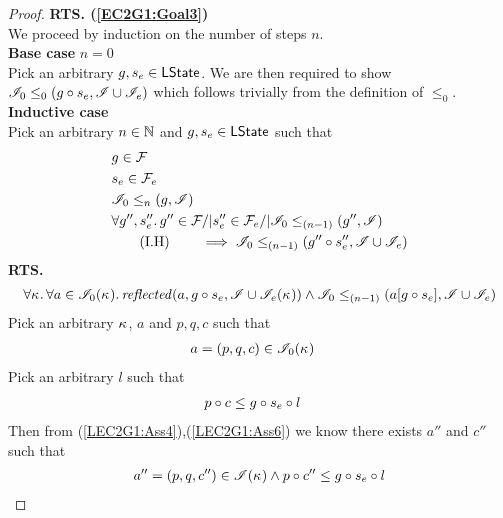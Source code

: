 \begin{lemma}
\begin{proof}
\noindent\textbf{RTS. (\ref{EC2G1:Goal3})} \\
We proceed by induction on the number of steps $n$.\\

\noindent\textbf{Base case }$n=0$\\
Pick an arbitrary $g, s_e \in \textsf{LState}$. We are then required to show	$\mathscr{I}_0 \leq_{0}\left(g \circ s_e, \mathscr{I} \cup \mathscr{I}_e\right)$ which follows trivially from the definition of $\leq_0$.\\


\noindent\textbf{Inductive case }\\
Pick an arbitrary $n \in \mathbb{N}$ and $g, s_e \in \textsf{LState}$ such that
%
\begin{align}
	& g \in \mathcal{F}_{} \label{LEC2G1:Ass1}\\
	& s_e \in \mathcal{F}_{e} \label{LEC2G1:Ass2}\\
	& \mathscr{I}_0 \leq_{n}\left(g, \mathscr{I}\right) \label{LEC2G1:Ass4}\\
	& \forall g'', s_e''.\,  g'' \in \mathcal{F}_{} /| s''_e \in \mathcal{F}_{e} /| \mathscr{I}_0 \leq_{(n-1)}\left(g'', \mathscr{I}\right) \nonumber \\
	& \tag{I.H} \qquad \implies \mathscr{I}_0 \leq_{(n-1)}\left(g''\circ s_e'', \mathscr{I} \cup \mathscr{I}_{e}\right) \label{LEC2G1:IH}
\end{align}
%
\textbf{RTS.}
%
\begin{align*}  
	& \quad
  \begin{array}{@{} l @{}}
  	\for{\ca{}}\for{a \in \lmod_0(\ca{})}
		\m{reflected}(a,g \composeL s_e, \lmod \cup \lmod_e(\ca{})) \land
		\isContainedAM{\lmod_0}{(n-1)}{a[g \composeL s_e]}{\lmod \cup \lmod_e}
 	\end{array} 
\end{align*}
%
Pick an arbitrary $\kappa_{}$, $a$ and $p, q, c$ such that
%
\begin{align}
	& a = (p, q, c) \in \mathscr{I}_0(\kappa_{}) \label{LEC2G1:Ass5}
\end{align}
Pick an arbitrary $l$ such that
%
\begin{align}
	& p \circ c \leq g \circ s_e \circ l \label{LEC2G1:Ass6}
\end{align}
Then from (\ref{LEC2G1:Ass4}),(\ref{LEC2G1:Ass6}) we know there exists $a''$ and $c''$ such that
%
\begin{align}
	a'' = (p, q, c'') \in \lmod(\ca{}) \land p \composeL c'' \leq g \composeL s_e \composeL l \label{LEC2G1:Ass7}

\end{align}
\end{proof}
\end{lemma}

